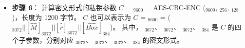 \documentclass[main\_\_CN.tex]{subfiles}
\begin{document}
\begin{itemize}
    \item {\bfseries 步骤 6}：
            计算密文形式的私钥参数 \begin{math}C\end{math} = \begin{math}[C]_{9600}\end{math} = 
            AES-CBC-ENC (\begin{math}[P]_{9600}\end{math}, \begin{math}[RSA\_DS\_KEY]_{256}\end{math}, \begin{math}[IV]_{128}\end{math})，长度为 1200 字节。
            \begin{math}C\end{math} 也可以表示为
            \begin{math}C\end{math} = \begin{math}[C]_{9600}\end{math} = 
            (\begin{math}
            [\widehat{Y}]_{3072} ||
            [\widehat{M}]_{3072} ||
            [\widehat{ \overline{r} }]_{3072} ||
            [\widehat{Box}]_{384} 
            \end{math})。
            其中，
            \begin{math} [\widehat{Y}]_{3072} \end{math}、
            \begin{math} [\widehat{M}]_{3072} \end{math}、
            \begin{math} [\widehat{ \overline{r} }]_{3072} \end{math}、
            \begin{math} [\widehat{Box}]_{384} \end{math}
            是 \begin{math}C\end{math} 的四个子参数，分别对应
            \begin{math} [Y]_{3072} \end{math}、
            \begin{math} [M]_{3072} \end{math}、
            \begin{math} [\overline{r}]_{3072} \end{math}、
            \begin{math} [Box]_{384} \end{math}
            的密文形式。
    
\end{itemize}
\end{document}
